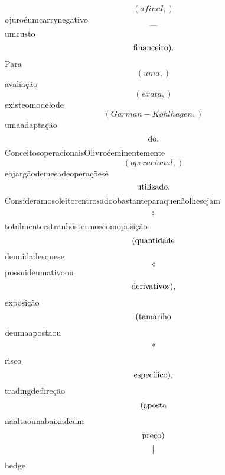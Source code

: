 \documentclass{article}
\begin{document}
\begin{equation}
\left( afinal,\right)
\end{equation}ojuroéumcarrynegativo\begin{equation}
—
\end{equation}umcusto\begin{equation}
$financeiro).$
\end{equation}Para\begin{equation}
\left( uma,\right)
\end{equation}avaliação\begin{equation}
\left( exata,\right)
\end{equation}existeomodelode\begin{equation}
\left( Garman - Kohlhagen,\right)
\end{equation}umaadaptação\begin{equation}
$do.$
\end{equation}ConceitosoperacionaisOlivroéeminentemente\begin{equation}
\left( operacional,\right)
\end{equation}eojargãodemesadeoperaçõesé\begin{equation}
$utilizado.$
\end{equation}Consideramosoleitorentrosadoobastanteparaquenãolhesejam\begin{equation}
$:$
\end{equation}totalmenteestranhostermoscomoposição\begin{equation}
$(quantidade$
\end{equation}deunidadesquese\begin{equation}
«
\end{equation}possuideumativoou\begin{equation}
$derivativos),$
\end{equation}exposição\begin{equation}
$(tamariho$
\end{equation}deumaapostaou\begin{equation}
$*$
\end{equation}risco\begin{equation}
$específico),$
\end{equation}tradingdedireção\begin{equation}
$(aposta$
\end{equation}naaltaounabaixadeum\begin{equation}
$preço)$
\end{equation}\begin{equation}
$|$
\end{equation}hedge\begin{equation}

\end{equation}
\end{document}
